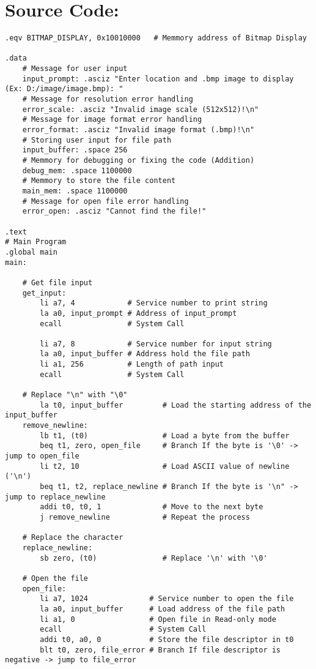 \documentclass{article}
\begin{document}
\section{Source Code:}
\begin{verbatim}
.eqv BITMAP_DISPLAY, 0x10010000   # Memmory address of Bitmap Display

.data
    # Message for user input
    input_prompt: .asciz "Enter location and .bmp image to display (Ex: D:/image/image.bmp): " 	
    # Message for resolution error handling
    error_scale: .asciz "Invalid image scale (512x512)!\n"	
    # Message for image format error handling
    error_format: .asciz "Invalid image format (.bmp)!\n"	
    # Storing user input for file path
    input_buffer: .space 256 					         
    # Memmory for debugging or fixing the code (Addition)
    debug_mem: .space 1100000					
    # Memmory to store the file content
    main_mem: .space 1100000					
    # Message for open file error handling
    error_open: .asciz "Cannot find the file!" 			
	    
.text
# Main Program
.global main
main:
    
    # Get file input
    get_input:
        li a7, 4            # Service number to print string
        la a0, input_prompt # Address of input_prompt
        ecall               # System Call

        li a7, 8            # Service number for input string
        la a0, input_buffer # Address hold the file path   
        li a1, 256          # Length of path input	
        ecall               # System Call

    # Replace "\n" with "\0"
        la t0, input_buffer         # Load the starting address of the input_buffer 
    remove_newline:		
        lb t1, (t0)                 # Load a byte from the buffer
        beq t1, zero, open_file     # Branch If the byte is '\0' -> jump to open_file
        li t2, 10                   # Load ASCII value of newline ('\n')
        beq t1, t2, replace_newline # Branch If the byte is '\n" -> jump to replace_newline
        addi t0, t0, 1              # Move to the next byte
        j remove_newline            # Repeat the process

    # Replace the character
    replace_newline:
        sb zero, (t0)               # Replace '\n' with '\0'
    
    # Open the file
    open_file:
        li a7, 1024              # Service number to open the file    
        la a0, input_buffer      # Load address of the file path 
        li a1, 0                 # Open file in Read-only mode
        ecall                    # System Call
        addi t0, a0, 0           # Store the file descriptor in t0
        blt t0, zero, file_error # Branch If file descriptor is negative -> jump to file_error 
    

\end{verbatim}
\end{document}
